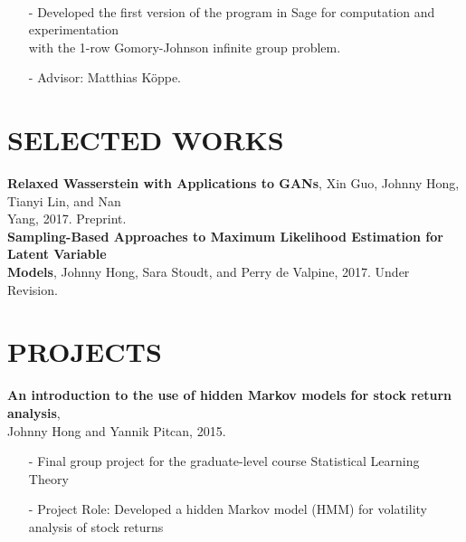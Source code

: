\documentclass{res}
\begin{document}
\begin{resume}
     \\ 
        \begin{itemize}
        \item[-] Developed the first version of the program in Sage for computation and experimentation
       \\with the 1-row Gomory-Johnson infinite group problem.
       \item[-] Advisor: Matthias K\"{o}ppe.
        \end{itemize}
%    

\section{SELECTED WORKS}
\textbf{Relaxed Wasserstein with Applications to GANs}, Xin Guo, Johnny Hong, Tianyi Lin, and Nan \\Yang, 2017. Preprint.
\\
\textbf{Sampling-Based Approaches to Maximum Likelihood Estimation for Latent Variable \\Models}, Johnny Hong, Sara Stoudt, and Perry de Valpine, 2017. Under Revision.

\section{PROJECTS}
\textbf{An introduction to the use of hidden Markov models for stock return analysis}, \\Johnny Hong and Yannik Pitcan, 2015.
            \begin{itemize}\setlength\itemsep{0em}
            \item[-] Final group project for the graduate-level course Statistical Learning Theory
            \item[-] Project Role: Developed a hidden Markov model (HMM) for volatility analysis of stock returns
            \end{itemize}
            

\end{resume}
\end{document}
